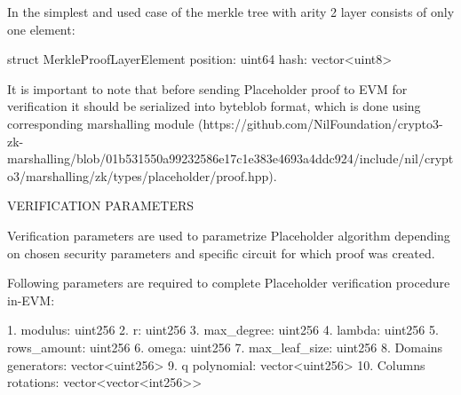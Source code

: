 In the simplest and used case of the merkle tree with arity 2 layer consists of only one element:

struct MerkleProofLayerElement {
    position: uint64
    hash: vector<uint8>
}

It is important to note that before sending Placeholder proof to EVM for verification it should be serialized into byteblob format, which is done using corresponding marshalling module (https://github.com/NilFoundation/crypto3-zk-marshalling/blob/01b531550a99232586e17c1e383e4693a4ddc924/include/nil/crypto3/marshalling/zk/types/placeholder/proof.hpp).

VERIFICATION PARAMETERS

Verification parameters are used to parametrize Placeholder algorithm depending on chosen security parameters and specific circuit for which proof was created.

Following parameters are required to complete Placeholder verification procedure in-EVM:

1. modulus: uint256
2. r: uint256
3. max_degree: uint256
4. lambda: uint256
5. rows_amount: uint256
6. omega: uint256
7. max_leaf_size: uint256
8. Domains generators: vector<uint256>
9. q polynomial: vector<uint256>
10. Columns rotations: vector<vector<int256>>
